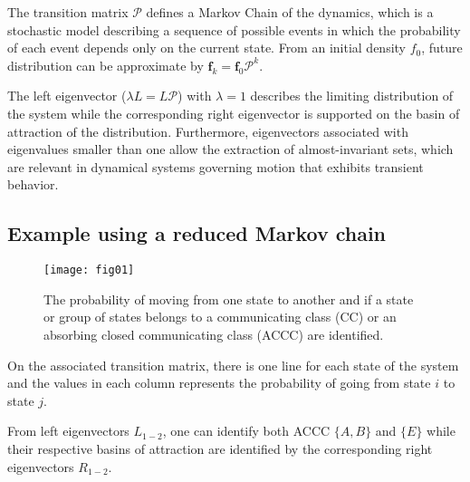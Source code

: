 \documentclass[final]{beamer}
\newcommand{\PF}{\mathcal{P}}
\begin{document}
\begin{frame}[t]
\begin{multicols}{3}
The transition matrix $\PF$ defines a Markov Chain of the dynamics, which is a
stochastic model describing a sequence of possible events in which the
probability of each event depends only on the current state. From an initial
density $f_0$, future distribution can be approximate by $\mathbf{f}_k =
\mathbf{f}_0 \PF^k$.

The left eigenvector ($\lambda L = L \PF$) with $\lambda = 1$ describes the
limiting distribution of the system while the corresponding right eigenvector
is supported on the basin of attraction of the distribution.  Furthermore,
eigenvectors associated with eigenvalues smaller than one allow the extraction
of almost-invariant sets, which are relevant in dynamical systems governing
motion that exhibits transient behavior.

\subsection{Example using a reduced Markov chain}
\begin{figure}[!ht]
  \centering
  \texttt{[image: fig01]}
\caption{The probability of moving from one state to another and if a state or
group of states belongs to a communicating class (CC) or an absorbing closed
communicating class (ACCC) are identified.}
  \label{fig:ccc}
\end{figure}
On the associated transition matrix, there is one line for each state of the
system and the values in each column represents the probability of going from
state $i$ to state $j$.

\vspace{0.5cm}
\columnbreak
From left eigenvectors $L_{1-2}$, one can identify both ACCC $\lbrace A,
B\rbrace$ and  $\lbrace E \rbrace$ while their respective basins of attraction
are identified by the corresponding right eigenvectors $R_{1-2}$.


\end{multicols}
\end{frame}
\end{document}
